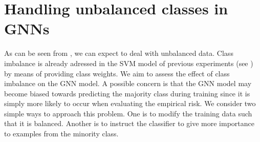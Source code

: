 \documentclass[
	fontsize=10pt, %
	twoside=true, %
	secnumdepth=1, %
  toc=indentunnumbered %
]{kaobook}
\begin{document}




\section{Handling unbalanced classes in GNNs}






As can be seen from , we can expect to deal with unbalanced
data. Class imbalance is already adressed in the SVM model of previous
experiments (see ) by means of providing class
weights. We aim to assess the effect of class imbalance on the GNN model.
A possible concern is that the GNN model may become biased towards predicting
the majority class during training since it is simply more likely to occur when
evaluating the empirical risk.
%
We consider two simple ways to approach this problem. One is to modify the
training data such that it is balanced. Another is to instruct the classifier to
give more importance to examples from the minority class.
\end{document}
